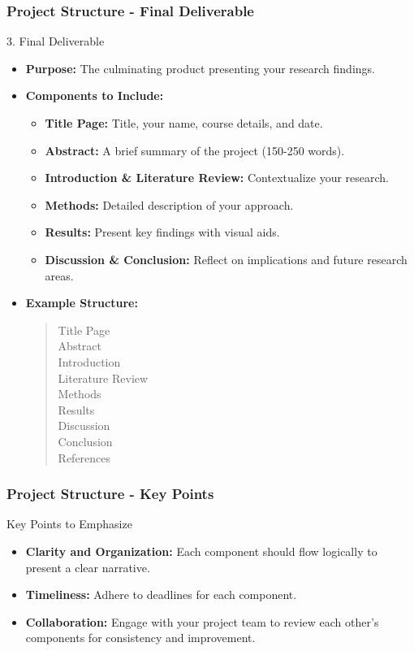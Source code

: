 \documentclass[aspectratio=169]{beamer}
\begin{document}
\begin{frame}[fragile]
    \frametitle{Project Structure - Final Deliverable}
    \begin{block}{3. Final Deliverable}
        \begin{itemize}
            \item \textbf{Purpose:} The culminating product presenting your research findings.
            \item \textbf{Components to Include:}
                \begin{itemize}
                    \item \textbf{Title Page:} Title, your name, course details, and date.
                    \item \textbf{Abstract:} A brief summary of the project (150-250 words).
                    \item \textbf{Introduction \& Literature Review:} Contextualize your research.
                    \item \textbf{Methods:} Detailed description of your approach.
                    \item \textbf{Results:} Present key findings with visual aids.
                    \item \textbf{Discussion \& Conclusion:} Reflect on implications and future research areas.
                \end{itemize}
            \item \textbf{Example Structure:} 
            \begin{quote}
                Title Page \\
                Abstract \\
                Introduction \\
                Literature Review \\
                Methods \\
                Results \\
                Discussion \\
                Conclusion \\
                References
            \end{quote}
        \end{itemize}
    \end{block}
\end{frame}

\begin{frame}[fragile]
    \frametitle{Project Structure - Key Points}
    \begin{block}{Key Points to Emphasize}
        \begin{itemize}
            \item \textbf{Clarity and Organization:} Each component should flow logically to present a clear narrative.
            \item \textbf{Timeliness:} Adhere to deadlines for each component.
            \item \textbf{Collaboration:} Engage with your project team to review each other's components for consistency and improvement.
        \end{itemize}
    \end{block}
\end{frame}
\end{document}
